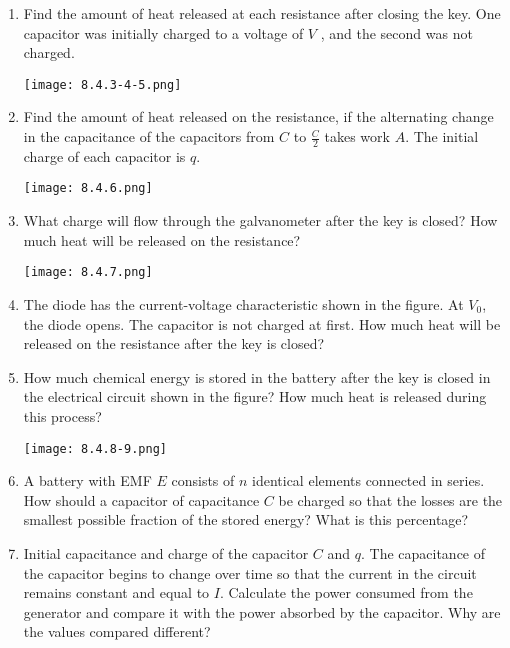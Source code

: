 \documentclass{article}
\begin{document}
\begin{enumerate}[label=8.4.\arabic*]
\item Find the amount of heat released at each resistance after closing the key. One capacitor was initially charged to a voltage of $V$ , and the second was not charged.

\begin{center}
    \texttt{[image: 8.4.3-4-5.png]}
\end{center}

\item Find the amount of heat released on the resistance, if the alternating change in the capacitance of the capacitors from $C$ to $\frac{C}{2}$ takes work $A$. The initial charge of each capacitor is $q$.

\begin{center}
    \texttt{[image: 8.4.6.png]}
\end{center}

\item What charge will flow through the galvanometer after the key is closed? How much heat will be released on the resistance?

\begin{center}
    \texttt{[image: 8.4.7.png]}
\end{center}

\item The diode has the current-voltage characteristic shown in the figure. At $V_0$, the diode opens. The capacitor is not charged at first. How much heat will be released on the resistance after the key is closed?

\item How much chemical energy is stored in the battery after the key is closed in the electrical circuit shown in the figure? How much heat is released during this process?

\begin{center}
    \texttt{[image: 8.4.8-9.png]}
\end{center}

\item A battery with EMF $E$ consists of $n$ identical elements connected in series. How should a capacitor of capacitance $C$ be charged so that the losses are the smallest possible fraction of the stored energy? What is this percentage?

\item Initial capacitance and charge of the capacitor $C$ and $q$. The capacitance of the capacitor begins to change over time so that the current in the circuit remains constant and equal to $I$. Calculate the power consumed from the generator and compare it with the power absorbed by the capacitor. Why are the values compared different?


\end{enumerate}
\end{document}
